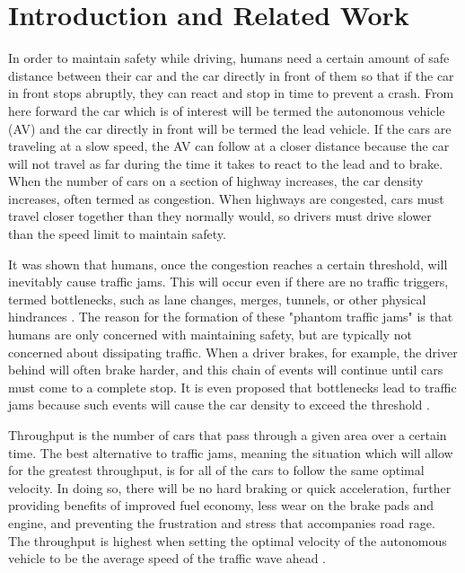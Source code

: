 \documentclass[conference]{IEEEtran}
\begin{document}







\section{Introduction and Related Work}
In order to maintain safety while driving, humans need a certain amount of safe distance between their car and the car directly in front of them so that if the car in front stops abruptly, they can react and stop in time to prevent a crash. From here forward the car which is of interest will be termed the autonomous vehicle (AV) and the car directly in front will be termed the lead vehicle. If the cars are traveling at a slow speed, the AV can follow at a closer distance because the car will not travel as far during the time it takes to react to the lead and to brake.
When the number of cars on a section of highway increases, the car density increases, often termed as congestion. When highways are congested, cars must travel closer together than they normally would, so drivers must drive slower than the speed limit to maintain safety.

It was shown that humans, once the congestion reaches a certain threshold, will inevitably cause traffic jams. This will occur even if there are no traffic triggers, termed bottlenecks, such as lane changes, merges, tunnels, or other physical hindrances \cite{sugiyama2008traffic}. The reason for the formation of these "phantom traffic jams" is that humans are only concerned with maintaining safety, but are typically not concerned about dissipating traffic. When a driver brakes, for example, the driver behind will often brake harder, and this chain of events will continue until cars must come to a complete stop. It is even proposed that bottlenecks lead to traffic jams because such events will cause the car density to exceed the threshold \cite{sugiyama2008traffic}.

Throughput is the number of cars that pass through a given area over a certain time. The best alternative to traffic jams, meaning the situation which will allow for the greatest throughput, is for all of the cars to follow the same optimal velocity. In doing so, there will be no hard braking or quick acceleration, further providing benefits of improved fuel economy, less wear on the brake pads and engine, and preventing the frustration and stress that accompanies road rage. The throughput is highest when setting the optimal velocity of the autonomous vehicle to be the average speed of the traffic wave ahead \cite{stern2018dissipation}.
\end{document}
